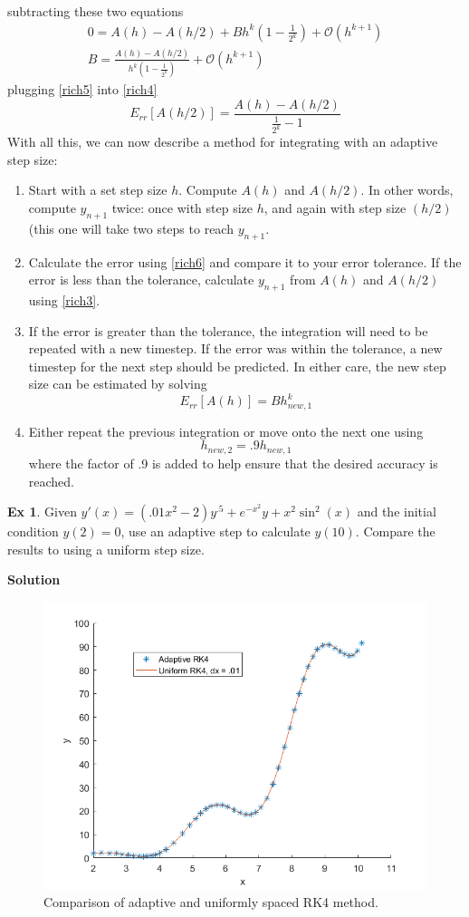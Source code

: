 \documentclass[]{article}
\theoremstyle{definition}
\newtheorem{exmp}{Ex}[section]
\numberwithin{equation}{section}
\begin{document}
	subtracting these two equations
	\begin{gather}
		0 = A(h) - A(h/2) + Bh^k (1 - \frac{1}{2^k}) + \mathcal{O}(h^{k+1}) \nonumber \\
		B = \frac{A(h) - A(h/2)}{h^k (1 - \frac{1}{2^k})} + \mathcal{O}(h^{k+1}) \label{rich5}
	\end{gather}
	plugging \eqref{rich5} into \eqref{rich4}
	\begin{equation}
		E_{rr}[A(h/2)] = \frac{A(h) - A(h/2)}{\frac{1}{2^k} - 1} \label{rich6}
	\end{equation} 
	With all this, we can now describe a method for integrating with an adaptive step size:
	\begin{enumerate}
		\item Start with a set step size $h$. Compute $A(h)$ and $A(h/2)$. In other words, compute $y_{n+1}$ twice: once with step size $h$, and again with step size $(h/2)$ (this one will take two steps to reach $y_{n+1}$.
		\item Calculate the error using \eqref{rich6} and compare it to your error tolerance. If the error is less than the tolerance, calculate $y_{n+1}$ from $A(h)$ and $A(h/2)$ using \eqref{rich3}.
		\item If the error is greater than the tolerance, the integration will need to be repeated with a new timestep. If the error was within the tolerance, a new timestep for the next step should be predicted. In either care, the new step size can be estimated by solving
		\[
			E_{rr} [A(h)] = Bh_{new,1}^k
		\]
		\item Either repeat the previous integration or move onto the next one using 
		\[
			h_{new,2} = .9 h_{new,1}
		\]
		where the factor of .9 is added to help ensure that the desired accuracy is reached.
		\end{enumerate}
		\begin{exmp}
			Given $y'(x) = (.01x^2-2)y^{.5} + e^{-x^2}y + x^2\sin^2(x)$ and the initial condition $y(2) = 0$, use an adaptive step to calculate $y(10)$. Compare the results to using a uniform step size.
		\end{exmp}
	\textbf{Solution}
		\begin{figure}[H]
		\includegraphics[scale=.7]{ex6_fig.png} 
		\caption{Comparison of adaptive and uniformly spaced RK4 method.}
		\label{fig:AdapRK4}
		\end{figure}
\end{document}
